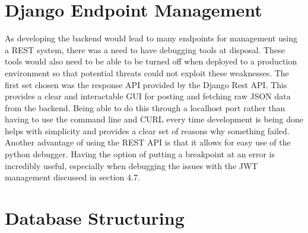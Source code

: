 \section{Django Endpoint Management}
As developing the backend would lead to many endpoints for management using a REST system, there was a need to have debugging tools at disposal. These tools would also need to be able to be turned off when deployed to a production environment so that potential threats could not exploit these weaknesses. The first set chosen was the response API provided by the Django Rest API. This provides a clear and interactable GUI for posting and fetching raw JSON data from the backend. Being able to do this through a localhost port rather than having to use the command line and CURL every time development is being done helps with simplicity and provides a clear set of reasons why something failed.
\newline
\newline
Another advantage of using the REST API is that it allows for easy use of the python debugger. Having the option of putting a breakpoint at an error is incredibly useful, especially when debugging the issues with the JWT management discussed in section 4.7.

\section{Database Structuring}

